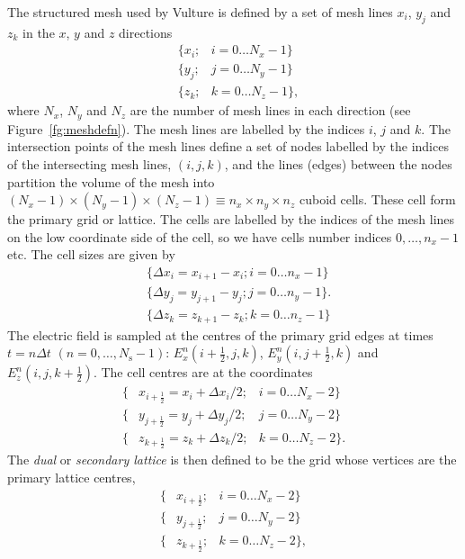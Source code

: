 \documentclass[onecolumn,a4paper]{article}
\newcommand{\half}{ {\scriptstyle \frac{1}{2}} }
\numberwithin{equation}{section}
\begin{document}
The structured mesh used by Vulture is defined by a set of mesh lines $x_i$, $y_j$ and $z_k$ in the $x$, $y$ 
and $z$ directions
\begin{eqnarray}
&\{ x_i;& i = 0 \ldots N_x - 1 \} \nonumber \\
&\{ y_j;& j = 0 \ldots N_y - 1 \} \\
&\{ z_k;& k = 0 \ldots N_z - 1 \},  \nonumber
\end{eqnarray}
where $N_x$, $N_y$ and $N_z$ are the number of mesh lines in each direction (see Figure~\ref{fg:meshdefn}). The mesh lines are
labelled by the indices $i$, $j$ and $k$. The intersection points of the mesh lines define a 
set of nodes labelled by the indices of the intersecting mesh lines, $(i,j,k)$, and the lines (edges) 
between the nodes partition the volume of the mesh into $(N_x-1) \times (N_y-1) \times (N_z-1) \equiv n_x \times n_y \times n_z$ cuboid cells.
These cell form the primary grid or lattice. The cells are labelled by the indices of the mesh lines on the low coordinate side of the 
cell, so we have cells number indices $0,\ldots,n_x-1$ etc. The cell sizes are given by
\begin{eqnarray}
& \{\Delta x_i = x_{i+1} - x_i ; i = 0 \ldots n_x-1 \} \nonumber \\
& \{\Delta y_j = y_{j+1} - y_j ; j = 0 \ldots n_y-1 \}.  \\
& \{\Delta z_k = z_{k+1} - z_k ; k = 0 \ldots n_z-1 \} \nonumber
\end{eqnarray}
The electric field is sampled at the centres of the primary grid edges at times $t=n \Delta t\,\,(n=0,\ldots,N_\mathrm{s}-1)$:
$E^{n}_x(i+\half,j,k)$, $E^{n}_y(i,j+\half,k)$ and $E^{n}_z(i,j,k+\half)$.
The cell centres are at the coordinates
\begin{eqnarray}
\{ &x_{i+\half} = x_i + \Delta x_i / 2;& i = 0 \ldots N_x-2 \} \nonumber \\
\{ &y_{j+\half} = y_j + \Delta y_j / 2;& j = 0 \ldots N_y-2 \} \nonumber \\
\{ &z_{k+\half} = z_k + \Delta z_k / 2;& k = 0 \ldots N_z-2 \}.
\end{eqnarray}
The {\em dual} or {\em secondary lattice} is then defined to be the grid whose
vertices are the primary lattice centres,
\begin{eqnarray}
\{ &x_{i+\half};& i = 0 \ldots N_x-2 \} \nonumber \\
\{ &y_{j+\half};& j = 0 \ldots N_y-2 \} \nonumber \\
\{ &z_{k+\half};& k = 0 \ldots N_z-2 \},
\end{eqnarray}
\end{document}
